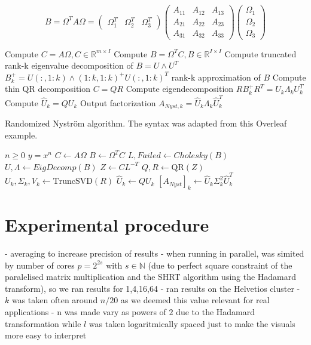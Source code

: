 \documentclass[a4paper, 12pt,oneside]{article}
\begin{document}
	$$
	B=\Omega^T A \Omega=\left(\begin{array}{lll}
		\Omega_1^T & \Omega_2^T & \Omega_3^T
		\end{array}\right)\left(\begin{array}{lll}
		A_{11} & A_{12} & A_{13} \\
		A_{21} & A_{22} & A_{23} \\
		A_{31} & A_{32} & A_{33}
		\end{array}\right)\left(\begin{array}{l}
		\Omega_1 \\
		\Omega_2 \\
		\Omega_3
		\end{array}\right)
	$$


	Compute $C=A \Omega, C \in \mathbb{R}^{m \times I}$
	Compute $B=\Omega^T C, B \in \mathbb{R}^{I \times I}$
	Compute truncated rank-k eigenvalue decomposition of $B=U \wedge U^T$ $B_k^{+}=U(:, 1: k) \wedge(1: k, 1: k)^{+} U(:, 1: k)^T$ rank-k approximation of $B$
	Compute thin QR decomposition $C=Q R$
	Compute eigendecomposition $R B_k^{+} R^T=U_k \Lambda_k U_k^T$
	Compute $\hat{U}_k=Q U_k$
	Output factorization $A_{N y s t, k}=\hat{U}_k \Lambda_k \hat{U}_k^T$
	\begin{algorithm}
		\caption{Randomized Nystr\"om algorithm. The syntax was adapted from this Overleaf example.}\label{alg:cap}
		\begin{algorithmic}
		\Require $n \geq 0$
		\Ensure $y = x^n$
		\State $C \gets A \Omega$
		\State $B \gets \Omega^T C$
		\State $L, Failed \gets Cholesky(B)$
			\State $U, \Lambda \gets EigDecomp(B)$
		\Else{}
			\State $Z \gets C L^{-T}$ 
			\State $Q, R \gets \text{QR}(Z)$
			\State $U_k, \Sigma_k, V_k \gets \text{TruncSVD}(R)$
			\State $\hat{U}_k \gets Q U_k$
			\State $[A_{N y s t}]_k \gets \hat{U}_k \Sigma_k^2 \hat{U}_k^T$
		\EndIf
		\end{algorithmic}
		\end{algorithm}
	
	\section{Experimental procedure}
		- averaging to increase precision of results
		- when running in parallel, was simited by number of cores $p=2^{2s}$ with $s\in\mathbb{N}$ (due to perfect square constraint of the paralelised matrix multiplication and the SHRT algorithm using the Hadamard transform), so we ran results for 1,4,16,64
		- ran results on the Helvetios cluster 
		- $k$ was taken often around $n/20$ as we deemed this value relevant for real applications
		- n was made vary as powers of $2$ due to the Hadamard transformation while $l$ was taken logaritmically spaced just to make the visuals more easy to interpret  
\end{document}
